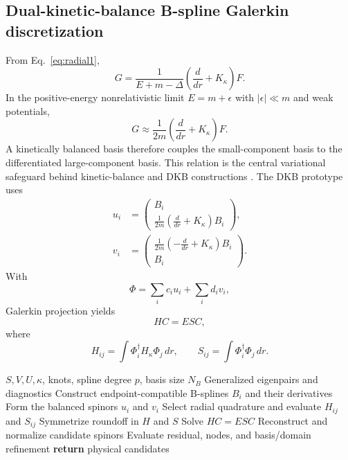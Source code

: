 \documentclass[a4paper,fleqn]{cas-dc}
\begin{document}
\subsection{Dual-kinetic-balance B-spline Galerkin discretization}
From Eq.~\eqref{eq:radial1},
\begin{equation}
G=
\frac{1}{E+m-\Delta}
\left(\frac{d}{dr}+K_\kappa\right)F.
\end{equation}
In the positive-energy nonrelativistic limit $E=m+\epsilon$ with
$|\epsilon|\ll m$ and weak potentials,
\begin{equation}
G\approx
\frac1{2m}
\left(\frac{d}{dr}+K_\kappa\right)F.
\label{eq:kb}
\end{equation}
A kinetically balanced basis therefore couples the small-component basis to
the differentiated large-component basis. This relation is the central
variational safeguard behind kinetic-balance and DKB constructions
\cite{Stanton1984,Kutzelnigg1984,Dyall1990,Beloy2008}. The DKB prototype uses
\begin{equation}
\begin{aligned}
u_i&=
\begin{pmatrix}
B_i\\
\frac{1}{2m}\left(\frac{d}{dr}+K_\kappa\right)B_i
\end{pmatrix},
\\[4pt]
v_i&=
\begin{pmatrix}
\frac{1}{2m}\left(-\frac{d}{dr}+K_\kappa\right)B_i\\
B_i
\end{pmatrix}.
\end{aligned}
\end{equation}
With
\begin{equation}
\Phi=\sum_i c_i u_i+\sum_i d_i v_i,
\end{equation}
Galerkin projection yields
\begin{equation}
HC=ESC,
\end{equation}
where
\begin{equation}
H_{ij}=\int\Phi_i^\dagger H_\kappa\Phi_j\,dr,
\qquad
S_{ij}=\int\Phi_i^\dagger\Phi_j\,dr.
\end{equation}


\begin{algorithm}[t]
\caption{Dual-kinetic-balance B-spline Galerkin solver}
\label{alg:dkb}
\begin{algorithmic}[1]
\Require $S,V,U,\kappa$, knots, spline degree $p$, basis size $N_B$
\Ensure Generalized eigenpairs and diagnostics
\State Construct endpoint-compatible B-splines $B_i$ and their derivatives
\State Form the balanced spinors $u_i$ and $v_i$
\EndFor
\State Select radial quadrature and evaluate $H_{ij}$ and $S_{ij}$
\State Symmetrize roundoff in $H$ and $S$
\State Solve $HC=ESC$
\State Reconstruct and normalize candidate spinors
\State Evaluate residual, nodes, and basis/domain refinement
\State \textbf{return} physical candidates
\end{algorithmic}
\end{algorithm}
\end{document}
